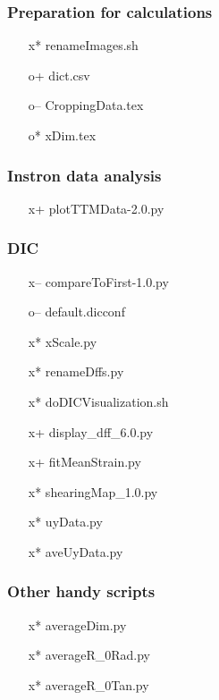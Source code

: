 \documentclass[a4paper]{article}
\begin{document}
\subsubsection{Preparation for calculations}

\begin{itemize}  
\item[x*] renameImages.sh
\item[o+] dict.csv
\item[o--] CroppingData.tex
\item[o*] xDim.tex
\end{itemize}

\subsubsection{Instron data analysis}

\begin{itemize}
\item[x+] plotTTMData-2.0.py
\end{itemize}

\subsubsection{DIC}

\begin{itemize}
\item[x--] compareToFirst-1.0.py 
\item[o--] default.dicconf
\item[x*] xScale.py
\item[x*] renameDffs.py
\item[x*] doDICVisualization.sh
\item[x+] display\_dff\_6.0.py
\item[x+] fitMeanStrain.py
\item[x*] shearingMap\_1.0.py
\item[x*] uyData.py
\item[x*] aveUyData.py
\end{itemize}

\subsubsection{Other handy scripts}

\begin{itemize}
\item[x*] averageDim.py
\item[x*] averageR\_0Rad.py
\item[x*] averageR\_0Tan.py
\end{itemize}
\end{document}
